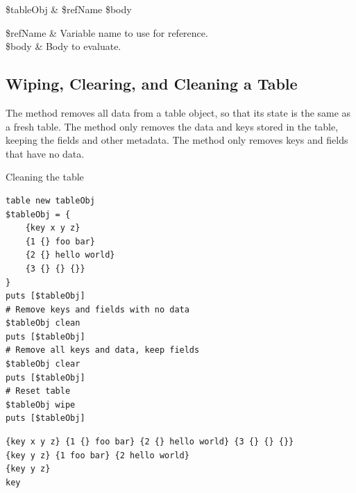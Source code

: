 \begin{syntax}
 \$tableObj \& \$refName \$body
\end{syntax}
\begin{args}
\$refName & Variable name to use for reference. \\
\$body & Body to evaluate.
\end{args}

\clearpage


\subsection{Wiping, Clearing, and Cleaning a Table}
The method  removes all data from a table object, so that its state is the same as a fresh table.
The method  only removes the data and keys stored in the table, keeping the fields and other metadata.
The method  only removes keys and fields that have no data.
\begin{syntax}
\end{syntax}
\begin{syntax}
\end{syntax}
\begin{syntax}
\end{syntax}

\begin{example}{Cleaning the table}
\begin{lstlisting}
table new tableObj
$tableObj = {
    {key x y z}
    {1 {} foo bar}
    {2 {} hello world}
    {3 {} {} {}}
}
puts [$tableObj]
# Remove keys and fields with no data
$tableObj clean
puts [$tableObj]
# Remove all keys and data, keep fields
$tableObj clear
puts [$tableObj]
# Reset table 
$tableObj wipe
puts [$tableObj]
\end{lstlisting}
\tcblower
\begin{lstlisting}
{key x y z} {1 {} foo bar} {2 {} hello world} {3 {} {} {}}
{key y z} {1 foo bar} {2 hello world}
{key y z}
key
\end{lstlisting}
\end{example}
\clearpage

